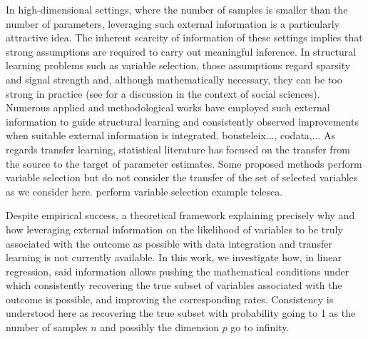 \documentclass[
  12pt]{article}
\begin{document}
In high-dimensional settings, where the number of samples is smaller than the number of parameters, leveraging such 
external information is a particularly attractive idea. The inherent scarcity of information of these settings implies that strong assumptions are required to carry out meaningful inference. In structural learning problems such as variable selection, those assumptions regard sparsity and signal strength and, although mathematically necessary, they can be too strong in practice 
(see \citep{giannone2021economic} for a discussion in the context of social sciences). Numerous applied and methodological works have employed such external information to guide structural learning and consistently observed improvements when suitable external information is integrated. bousteleix..., codata,... As regards transfer learning, statistical literature has focused on the transfer from the source to the target of parameter estimates. Some proposed methods perform variable selection but do not consider the transfer of the set of selected variables as we consider here.  perform variable selection example telesca.


Despite empirical success, a theoretical framework explaining precisely why and how leveraging external information on the likelihood of variables to be truly associated with the outcome as possible with data integration and transfer learning is not currently available. In this work, we investigate how, in linear regression, said information allows pushing the mathematical conditions under which consistently recovering the true subset of variables associated with the outcome is possible, and improving the corresponding rates. Consistency is understood here as recovering the true subset with probability going to 1 as the number of samples $n$ and possibly the dimension $p$ go to infinity. 
\end{document}
